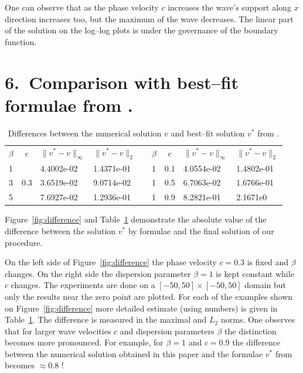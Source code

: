 \documentclass{article}
\begin{document}
One can observe that as the phase velocity $c$ increases the wave's support  along $x$ direction increases too, but the maximum of the wave decreases. The linear part of the solution on the log--log plots is under the governance of the boundary function.

\bigskip


\section{6.~Comparison with best--fit formulae from \cite{Ch2011}.}

\begin{center}
\begin{table}[ht]
\centering
\resizebox{12cm}{!} {
		\begin{tabular}{|l|c|l l| c|l|c|l l|}
			\cline{1-4}\cline{6-9}
$\beta$&c&$\|v^*-v \|_{\infty }$&$\|v^*-v \|_{2 }$& &$\beta$& c&$\|v^*-v \|_{\infty }$&$\|v^*-v \|_{2 }$\\
			\cline{1-4}\cline{6-9}
1&     &4.4002e-02 & 1.4371e-01 & &    1& 0.1& 4.0554e-02  &1.4802e-01\\
3& 0.3 &3.6519e-02 & 9.0714e-02& &    1& 0.5& 6.7063e-02  &1.6766e-01\\
5&     &7.6927e-02 & 1.2936e-01 & &    1& 0.9&  8.2821e-01 &2.1671e0\\
			\cline{1-4}\cline{6-9}
\end{tabular}
}
		\caption{Differences between the numerical solution $v$ and best--fit solution $v^*$ from \cite{Ch2011}.}
\label{tab:first-der-t}
\end{table}
\end{center}

Figure~\ref{fig:difference} and Table~\ref{tab:first-der-t} demonstrate the  absolute value of the difference between  the solution $v^*$ by formulae \cite{Ch2011}  and the final solution of our procedure.

On the left side of Figure~\ref{fig:difference} the phase velocity $c = 0.3$ is fixed  and $\beta$ changes. On the right side  the dispersion parameter $\beta=1$ is kept constant while $c$ changes. The experiments are done on a $[-50,  50] \times [-50,50]$  domain  but only the results near the zero point are plotted. For each of the examples shown on Figure~\ref{fig:difference} more detailed estimate (using numbers) is given in Table~\ref{tab:first-der-t}. The difference is measured in the maximal and $L_2$ norms. One observes that for larger wave velocities $c$ and dispersion parameters $\beta$ the distinction becomes more pronounced. For example, for $\beta =1$ and $c=0.9$ the difference between the numerical solution obtained in this paper and the formulae  $v^*$ from \cite{Ch2011} becomes $\approx 0.8$ !
\end{document}
